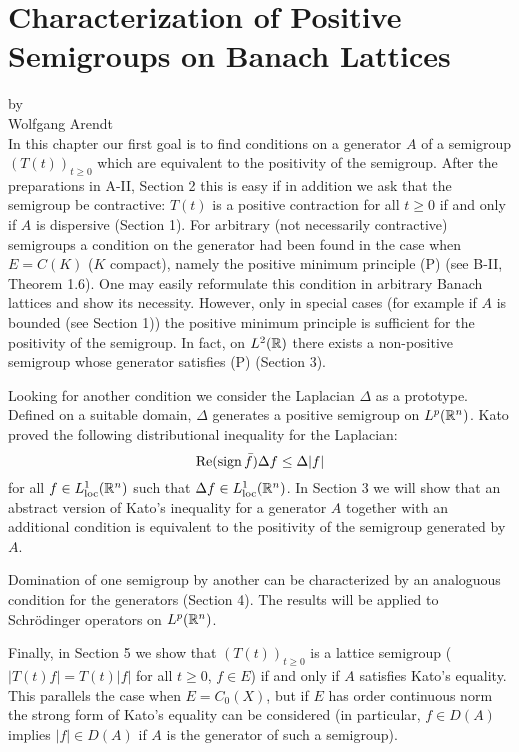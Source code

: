 \setcounter{chapter}{1}
\chapter{Characterization of Positive Semigroups on Banach Lattices}\label{chap:c2}
{\Large
\vspace*{-.75cm}
by \\[.25em]
Wolfgang Arendt
\vspace{.75cm}
\\
}
In this chapter our first goal is to find conditions on a generator $A$ of a semigroup $(T(t))_{t \geq 0}$ which are equivalent to the positivity of the semigroup.
After the preparations in A-II, Section 2 this is easy if in addition we ask that the semigroup be contractive: $T(t)$ is a positive contraction for all $t \geq 0$ if and only if $A$ is dispersive (Section 1).
For arbitrary (not necessarily contractive) semigroups a condition on the generator had been found in the case when $E = C(K)$ ($K$ compact), namely the positive minimum principle (P) (see B-II, Theorem 1.6).
One may easily reformulate this condition in arbitrary Banach lattices and show its necessity.
However, only in special cases (for example if $A$ is bounded (see Section 1)) the positive minimum principle is sufficient for the positivity of the semigroup.
In fact, on $L^{2}(\mathbb{R})$ there exists a non-positive semigroup whose generator satisfies (P) (Section 3).

Looking for another condition we consider the Laplacian $\Delta$ as a prototype.
Defined on a suitable domain, $\Delta$ generates a positive semigroup on $L^p(\mathbb{R}^n)$.
Kato proved the following distributional inequality for the Laplacian:
\[
\mathop{}\!\mathrm{Re}(\operatorname{sign} \bar{f}) \Delta f \leq \Delta|f|
\]
for all $f \in L^1_{\text{loc}}(\mathbb{R}^{n})$ such that $\Delta f \in L^1_{\text{loc}}(\mathbb{R}^{n})$.
In Section 3 we will show that an abstract version of Kato's inequality for a generator $A$ together with an additional condition is equivalent to the positivity of the semigroup generated by $A$.

Domination of one semigroup by another can be characterized by an analoguous condition for the generators (Section 4).
The results will be applied to Schrödinger operators on $L^p(\mathbb{R}^n)$.

Finally, in Section 5 we show that $(T(t))_{t \geq 0}$ is a lattice semigroup (\ie $|T(t) f| = T(t) |f|$ for all $t \geq 0$, $f \in E$) if and only if $A$ satisfies Kato's equality.
This parallels the case when $E = C_{0}(X)$, but if $E$ has order continuous norm the strong form of Kato's equality can be considered (in particular, $f \in D(A)$ implies $|f| \in D(A)$ if $A$ is the generator of such a semigroup).
